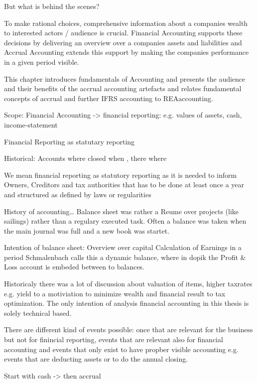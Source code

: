 But what is behind the scenes?


To make rational choices, comprehensive information about a companies wealth to interested actors / audience is crucial.
Financial Accounting supports these decisions by delivering an overview over a companies assets and liabilities and Accrual Accounting extends this support by making the companies performance in a given period visible.

This chapter introduces fundamentals of Accounting and presents the audience and their benefits of the accrual accounting artefacts and relates fundamental concepts of accrual and further IFRS accounting to REA\textcopyright accounting.

Scope: Financial Accounting -> financial reporting: e.g. values of assets, cash, income-statement

Financial Reporting as statutary reporting

Historical: Accounts where closed when , there where 

We mean financial reporting as statutory reporting as it is needed to inform Owners, Creditors and tax authorities that has to be done at least once a year and structured as defined by laws or regularities

History of accounting\dots
Balance sheet was rather a Reume over projects (like sailings) rather than a regulary executed task.
Often a balance was taken when the main journal was full and a new book was startet.

Intention of balance sheet:
Overview over capital
Calculation of Earnings in a period
Schmalenbach calls this a dynamic balance, where in dopik the Profit \& Loss account is embeded between to balances.

Historicaly there was a lot of discussion about valuation of items, higher taxrates e.g. yield to a motiviation to minimize wealth and financial result to tax optimization.
The only intention of analysis financial accounting in this thesis is solely technical based.

There are different kind of events possible: once that are relevant for the business but not for finincial reporting, events that are relevant also for financial accounting and events that only exist to have propber visible accounting e.g. events that are deducting assets or to do the annual closing.



Start with cash -> then accrual


